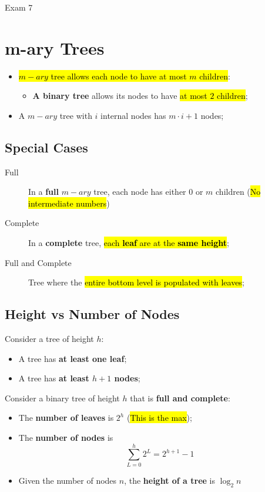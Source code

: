 \documentclass{note}
\begin{document}
\begin{note}{Exam 7}
\section{m-ary Trees}

\begin{itemize}
    \item \hl{$ m-ary $ tree allows each node to have at most $ m $ children}:
    \begin{itemize}
        \item \textbf{A binary tree} allows its nodes to have \hl{at most $ 2 $ children};
    \end{itemize}

    \item A $ m-ary $ tree with $ i $ internal nodes has $ m \cdot i + 1 $ nodes;
\end{itemize}

    \subsection{Special Cases}
    \begin{description}
        \item[Full] In a \textbf{full} $ m-ary $ tree, each node has either $ 0 $ or $ m $ children (\hl{No intermediate numbers})
        \item[Complete] In a \textbf{complete} tree, \hl{each \textbf{leaf} are at the \textbf{same height}};
        \item[Full and Complete] Tree where the \hl{entire bottom level is populated with leaves};
    \end{description}

    \subsection{Height vs Number of Nodes}

    Consider a tree of height $ h $:
    \begin{itemize}
        \item A tree has \textbf{at least one leaf};
        \item A tree has \textbf{at least $ h + 1 $ nodes};
    \end{itemize}

    Consider a binary tree of height $ h $ that is \textbf{full and complete}:
    \begin{itemize}
        \item The \textbf{number of leaves} is $ 2^{h} $ (\hl{This is the max});
        \item The \textbf{number of nodes} is
        \begin{equation}
            \sum_{L = 0}^{h} 2^{L} = 2^{h + 1} - 1
        \end{equation}
        \item Given the number of nodes $ n $, the \textbf{height of a tree} is $ \log_{2}n $
    \end{itemize}


\end{note}
\end{document}
